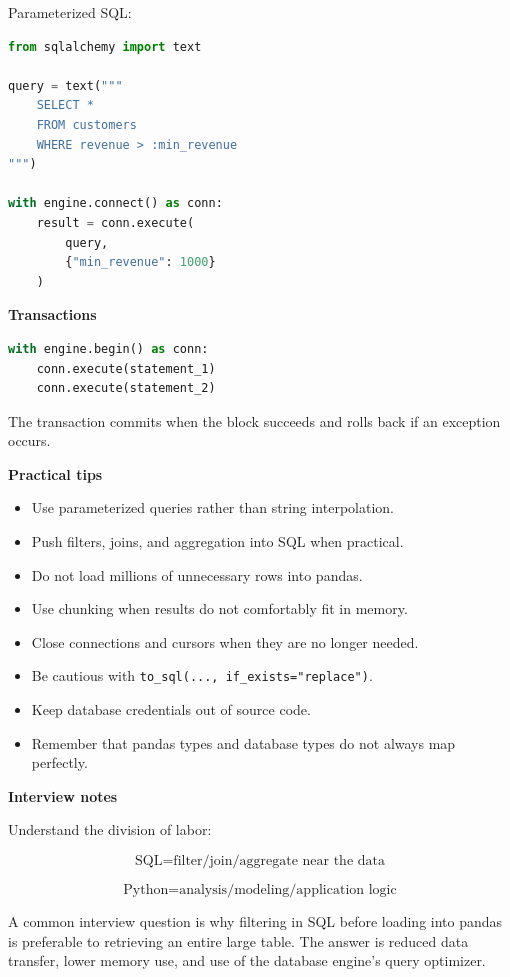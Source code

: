\documentclass[11pt,letterpaper]{article}
\begin{document}
Parameterized SQL:

\begin{lstlisting}[language=Python]
from sqlalchemy import text

query = text("""
    SELECT *
    FROM customers
    WHERE revenue > :min_revenue
""")

with engine.connect() as conn:
    result = conn.execute(
        query,
        {"min_revenue": 1000}
    )
\end{lstlisting}

\textbf{Transactions}

\begin{lstlisting}[language=Python]
with engine.begin() as conn:
    conn.execute(statement_1)
    conn.execute(statement_2)
\end{lstlisting}

The transaction commits when the block succeeds and rolls back if an exception
occurs.

\textbf{Practical tips}

\begin{itemize}[leftmargin=*]
    \item Use parameterized queries rather than string interpolation.
    \item Push filters, joins, and aggregation into SQL when practical.
    \item Do not load millions of unnecessary rows into pandas.
    \item Use chunking when results do not comfortably fit in memory.
    \item Close connections and cursors when they are no longer needed.
    \item Be cautious with \texttt{to\_sql(..., if\_exists="replace")}.
    \item Keep database credentials out of source code.
    \item Remember that pandas types and database types do not always map perfectly.
\end{itemize}

\textbf{Interview notes}

Understand the division of labor:

\[
\text{SQL}
=
\text{filter/join/aggregate near the data}
\]

\[
\text{Python}
=
\text{analysis/modeling/application logic}
\]

A common interview question is why filtering in SQL before loading into pandas
is preferable to retrieving an entire large table. The answer is reduced data
transfer, lower memory use, and use of the database engine's query optimizer.
\end{document}
